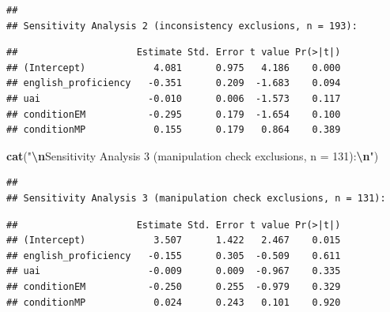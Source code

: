 \documentclass[
]{article}
\newenvironment{Shaded}{\begin{snugshade}}{\end{snugshade}}
\newcommand{\DecValTok}[1]{\textcolor[rgb]{0.00,0.00,0.81}{#1}}
\newcommand{\FunctionTok}[1]{\textcolor[rgb]{0.13,0.29,0.53}{\textbf{#1}}}
\newcommand{\NormalTok}[1]{#1}
\newcommand{\SpecialCharTok}[1]{\textcolor[rgb]{0.81,0.36,0.00}{\textbf{#1}}}
\newcommand{\StringTok}[1]{\textcolor[rgb]{0.31,0.60,0.02}{#1}}
\begin{document}
\begin{verbatim}
## 
## Sensitivity Analysis 2 (inconsistency exclusions, n = 193):
\end{verbatim}

\begin{Shaded}
\end{Shaded}

\begin{verbatim}
##                     Estimate Std. Error t value Pr(>|t|)
## (Intercept)            4.081      0.975   4.186    0.000
## english_proficiency   -0.351      0.209  -1.683    0.094
## uai                   -0.010      0.006  -1.573    0.117
## conditionEM           -0.295      0.179  -1.654    0.100
## conditionMP            0.155      0.179   0.864    0.389
\end{verbatim}

\begin{Shaded}
\begin{Highlighting}[]
\FunctionTok{cat}\NormalTok{(}\StringTok{"}\SpecialCharTok{\textbackslash{}n}\StringTok{Sensitivity Analysis 3 (manipulation check exclusions, n = 131):}\SpecialCharTok{\textbackslash{}n}\StringTok{"}\NormalTok{)}
\end{Highlighting}
\end{Shaded}

\begin{verbatim}
## 
## Sensitivity Analysis 3 (manipulation check exclusions, n = 131):
\end{verbatim}

\begin{Shaded}
\end{Shaded}

\begin{verbatim}
##                     Estimate Std. Error t value Pr(>|t|)
## (Intercept)            3.507      1.422   2.467    0.015
## english_proficiency   -0.155      0.305  -0.509    0.611
## uai                   -0.009      0.009  -0.967    0.335
## conditionEM           -0.250      0.255  -0.979    0.329
## conditionMP            0.024      0.243   0.101    0.920
\end{verbatim}
\end{document}
